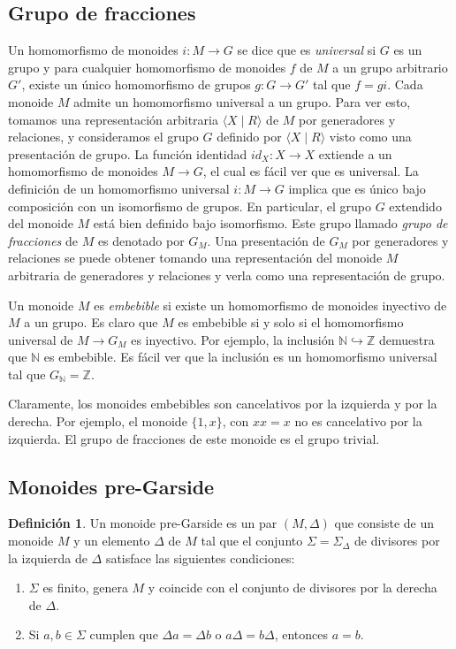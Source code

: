 \documentclass[12pt]{book}
\theoremstyle{definition}
\newtheorem{defi}{Definición}[section]
\begin{document}
\subsection{Grupo de fracciones}

Un homomorfismo de monoides $i:M\rightarrow G$ se dice que es \textit{universal} si $G$ es un grupo y para cualquier homomorfismo de monoides $f$ de $M$ a un grupo arbitrario $G'$, existe un único homomorfismo de grupos $g:G\rightarrow G'$ tal que $f=gi$. Cada monoide $M$ admite un homomorfismo universal a un grupo. Para ver esto, tomamos una representación arbitraria $\langle X \mid R \rangle$ de $M$ por generadores y relaciones, y consideramos el grupo $G$ definido por $\langle X \mid R \rangle$ visto como una presentación de grupo. La función identidad $id_X:X\rightarrow X$ extiende a un homomorfismo de monoides $M\rightarrow G$, el cual es fácil ver que es universal. La definición de un homomorfismo universal $i:M\rightarrow G$ implica que es único bajo composición con un isomorfismo de grupos. En particular, el grupo $G$ extendido del monoide $M$ está bien definido bajo isomorfismo. Este grupo llamado \textit{grupo de fracciones} de $M$ es denotado por $G_M$. Una presentación de $G_M$ por generadores y relaciones se puede obtener tomando una representación del monoide $M$ arbitraria de generadores y relaciones y verla como una representación de grupo.

Un monoide $M$ es \textit{embebible} si existe un homomorfismo de monoides inyectivo de $M$ a un grupo. Es claro que $M$ es embebible si y solo si el homomorfismo universal de $M\rightarrow G_M$ es inyectivo. Por ejemplo, la inclusión $\mathbb{N}\hookrightarrow\mathbb{Z}$ demuestra que $\mathbb{N}$ es embebible. Es fácil ver que la inclusión es un homomorfismo universal tal que $G_\mathbb{N}=\mathbb{Z}$.

Claramente, los monoides embebibles son cancelativos por la izquierda y por la derecha. Por ejemplo, el monoide $\{1,x\}$, con $xx=x$ no es cancelativo por la izquierda. El grupo de fracciones de este monoide es el grupo trivial.

\subsection{Monoides pre-Garside}

\begin{defi}
Un monoide pre-Garside es un par $(M,\Delta)$ que consiste de un monoide $M$ y un elemento $\Delta$ de $M$ tal que el conjunto $\Sigma=\Sigma_\Delta$ de divisores por la izquierda de $\Delta$ satisface las siguientes condiciones:

\begin{enumerate}
\item $\Sigma$ es finito, genera $M$ y  coincide con el conjunto de divisores por la derecha de $\Delta$.
\item Si $a,b\in\Sigma$ cumplen que $\Delta a=\Delta b$ o $a\Delta=b\Delta$, entonces $a=b$.
\end{enumerate}
\label{defi:pre-garside}
\end{defi}
\end{document}
